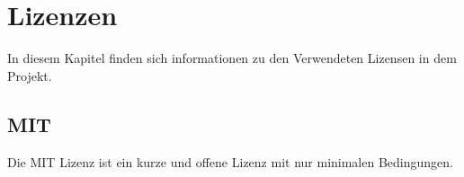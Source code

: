 \chapter{Lizenzen}

In diesem Kapitel finden sich informationen zu den Verwendeten Lizensen in dem Projekt.

\section{MIT}\label{sec:mit}
Die MIT Lizenz ist ein kurze und offene Lizenz mit nur minimalen Bedingungen.
